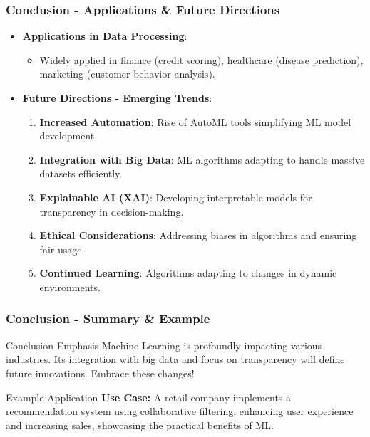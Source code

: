 \documentclass[aspectratio=169]{beamer}
\begin{document}
\begin{frame}[fragile]
    \frametitle{Conclusion - Applications & Future Directions}
    \begin{itemize}
        \item \textbf{Applications in Data Processing}:
        \begin{itemize}
            \item Widely applied in finance (credit scoring), healthcare (disease prediction), marketing (customer behavior analysis).
        \end{itemize}

        \item \textbf{Future Directions - Emerging Trends}:
        \begin{enumerate}
            \item \textbf{Increased Automation}: Rise of AutoML tools simplifying ML model development.
            \item \textbf{Integration with Big Data}: ML algorithms adapting to handle massive datasets efficiently.
            \item \textbf{Explainable AI (XAI)}: Developing interpretable models for transparency in decision-making.
            \item \textbf{Ethical Considerations}: Addressing biases in algorithms and ensuring fair usage.
            \item \textbf{Continued Learning}: Algorithms adapting to changes in dynamic environments.
        \end{enumerate}
    \end{itemize}
\end{frame}

\begin{frame}[fragile]
    \frametitle{Conclusion - Summary & Example}
    \begin{block}{Conclusion Emphasis}
        Machine Learning is profoundly impacting various industries. Its integration with big data and focus on transparency will define future innovations. Embrace these changes!
    \end{block}

    \begin{exampleblock}{Example Application}
        \textbf{Use Case:} A retail company implements a recommendation system using collaborative filtering, enhancing user experience and increasing sales, showcasing the practical benefits of ML.
    \end{exampleblock}
\end{frame}
\end{document}
